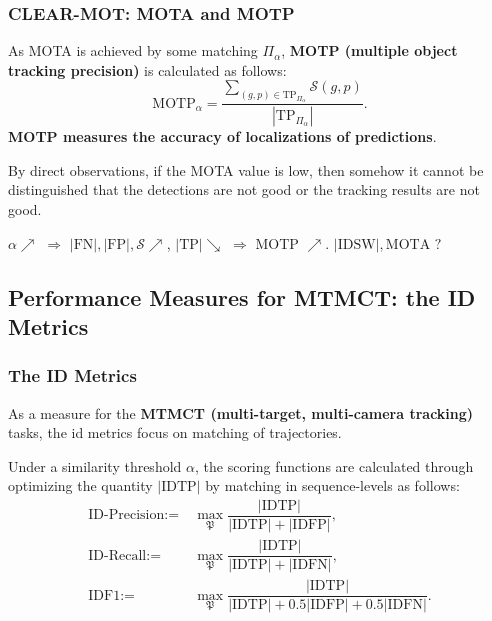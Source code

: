 \documentclass[slidetop, mathserif]{beamer}
\begin{document}
\begin{frame}
	\frametitle{CLEAR-MOT: MOTA and MOTP}
			
	As MOTA is achieved by some matching $\Pi_\alpha$, {\bf MOTP (multiple object tracking precision)}
	is calculated as follows:
	\[
		\text{MOTP}_\alpha =
		\dfrac{\sum_{(g,p)\in\text{TP}_{\Pi_\alpha}}\mathcal S(g,p)}{|\text{TP}_{\Pi_\alpha}|}.
	\]
	{\bf\color{red} MOTP measures the accuracy of localizations of predictions}.
			
	\vspace{4pt}
			
	By direct observations, if the MOTA value is low,
	then somehow it cannot be distinguished that
	the detections are not good or the tracking results are not good.
			
	\vspace{5pt}
		
	$\alpha\nearrow$ $\Rightarrow$ $|\text{FN}|, |\text{FP}|, \mathcal S \nearrow$, $|\text{TP}| \searrow$ $\Rightarrow$ MOTP $\nearrow$.
	$|\text{IDSW}|, \text{MOTA}$ $?$
		
			
			
\end{frame}

\subsection{Performance Measures for MTMCT: the ID Metrics}

\begin{frame}
	\frametitle{The ID Metrics}
			
	As a measure for the {\bf MTMCT (multi-target, multi-camera tracking)} tasks,
	the id metrics focus on matching of trajectories.
			
	\quad 
			
	Under a similarity threshold $\alpha$, the scoring functions are calculated through optimizing
	the quantity $|\text{IDTP}|$ by matching in sequence-levels as follows:
	\begin{align*}
		\text{ID-Precision} := & ~ \max_{\mathfrak P} \dfrac{|\text{IDTP}|}{|\text{IDTP}| + |\text{IDFP}|}, \\
		\text{ID-Recall} :=    & ~ \max_{\mathfrak P}\dfrac{|\text{IDTP}|}{|\text{IDTP}| + |\text{IDFN}|},  \\
		\text{IDF1} :=         &                                                                            
		~ \max_{\mathfrak P}\dfrac{|\text{IDTP}|}{|\text{IDTP}| + 0.5|\text{IDFP}| + 0.5|\text{IDFN}|}.
	\end{align*}
			
\end{frame}
\end{document}

